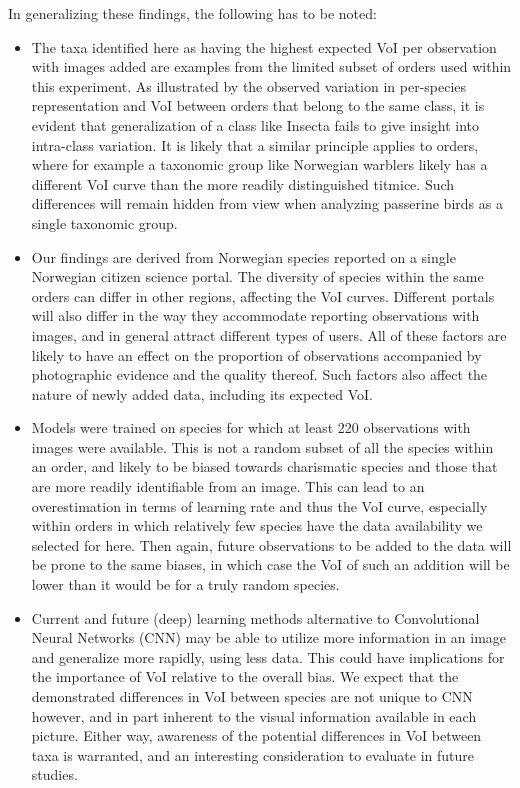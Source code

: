 \documentclass{article}
\begin{document}
In generalizing these findings, the following has to be noted:
\begin{itemize}
\item The taxa identified here as having the highest expected VoI per observation with images added are examples from the limited subset of orders used within this experiment. As illustrated by the observed variation in per-species representation and VoI between orders that belong to the same class, it is evident that generalization of a class like Insecta fails to give insight into intra-class variation. It is likely that a similar principle applies to orders, where for example a taxonomic group like Norwegian warblers likely has a different VoI curve than the more readily distinguished titmice. Such differences will remain hidden from view when analyzing passerine birds as a single taxonomic group.
\item Our findings are derived from Norwegian species reported on a single Norwegian citizen science portal. The diversity of species within the same orders can differ in other regions, affecting the VoI curves. Different portals will also differ in the way they accommodate reporting observations with images, and in general attract different types of users\autocite{Boakes2016}. All of these factors are likely to have an effect on the proportion of observations accompanied by photographic evidence and the quality thereof. Such factors also affect the nature of newly added data, including its expected VoI.
\item Models were trained on species for which at least 220 observations with images were available. This is not a random subset of all the species within an order, and likely to be biased towards charismatic species and those that are more readily identifiable from an image. This can lead to an overestimation in terms of learning rate and thus the VoI curve, especially within orders in which relatively few species have the data availability we selected for here. Then again, future observations to be added to the data will be prone to the same biases, in which case the VoI of such an addition will be lower than it would be for a truly random species.
\item Current and future (deep) learning methods alternative to Convolutional Neural Networks (CNN) may be able to utilize more information in an image and generalize more rapidly, using less data. This could have implications for the importance of VoI relative to the overall bias. We expect that the demonstrated differences in VoI between species are not unique to CNN however, and in part inherent to the visual information available in each picture. Either way, awareness of the potential differences in VoI between taxa is warranted, and an interesting consideration to evaluate in future studies.
\end{itemize}
\end{document}
